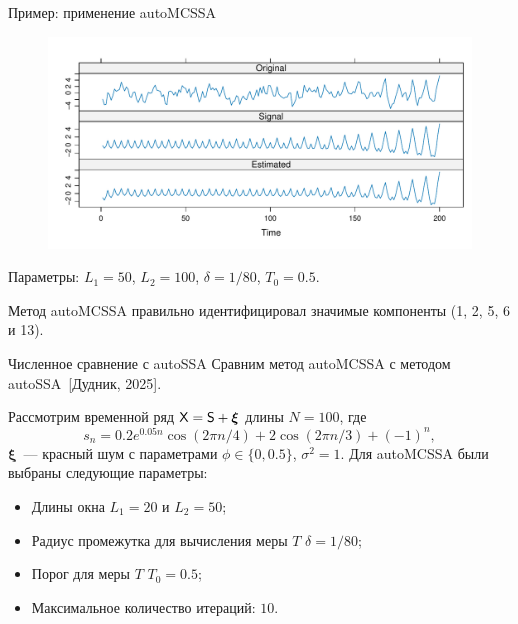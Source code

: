 \documentclass[notheorems, handout]{beamer}
\begin{document}
\begin{frame}{Пример: применение autoMCSSA}
	\begin{figure}
		\centering
		\includegraphics[width=\textwidth]{img/auto_mcssa_result.pdf}
	\end{figure}
	Параметры: $L_1=50$, $L_2=100$, $\delta=1/80$, $T_0=0.5$.\medskip

	Метод autoMCSSA правильно идентифицировал значимые компоненты (1, 2, 5, 6 и 13).
\end{frame}

\begin{frame}{Численное сравнение с autoSSA}
	Сравним метод autoMCSSA с методом autoSSA~[Дудник, 2025].\medskip

	Рассмотрим временной ряд $\mathsf{X} = \mathsf{S} + \bm\xi$ длины $N=100$, где
	$$
	s_n=0.2e^{0.05 n}\cos(2\pi n/4) + 2\cos(2\pi n / 3) + (-1)^n,
	$$
	$\bm\xi$~--- красный шум с параметрами $\phi\in\{0, 0.5\}$, $\sigma^2=1$. Для autoMCSSA были выбраны следующие параметры:\smallskip
	\begin{itemize}
		\item Длины окна $L_1=20$ и $L_2=50$;\smallskip
		\item Радиус промежутка для вычисления меры $T$ $\delta = 1 / 80$;\smallskip
		\item Порог для меры $T$ $T_0=0.5$;\smallskip
		\item Максимальное количество итераций: $10$.
	\end{itemize}
\end{frame}
\end{document}
